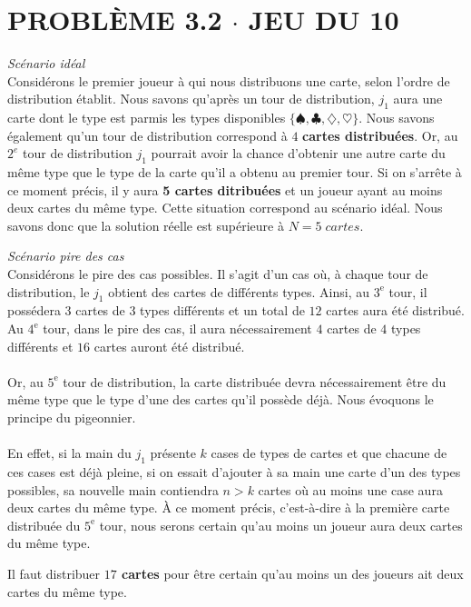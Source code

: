 \documentclass[8pt]{report}
\begin{document}
        \section*{\textnormal{PROBLÈME 3.2 \;\;\;\; $\cdot$ \;\;\;\; JEU DU 10 }} 
        \noindent \textcolor{myb}{\textit{Scénario idéal}}\\ 
        \indent Considérons le premier joueur à qui nous distribuons une carte, selon l'ordre de distribution établit. Nous 
        savons qu'après un tour de distribution, $j_1$ aura une carte dont le type est parmis les types disponibles 
        $\{\spadesuit, \clubsuit, \diamondsuit, \heartsuit\}$. Nous savons également qu'un tour de distribution 
        correspond à $4$ \textbf{cartes distribuées}. Or, au $2^e$ tour de distribution $j_1$ pourrait avoir la chance 
        d'obtenir une autre carte du même type que le type de la carte qu'il a obtenu au premier tour. Si on s'arrête à 
        ce moment précis, il y aura \textbf{5 cartes ditribuées} et un joueur ayant au moins deux cartes du même type. 
        Cette situation correspond au scénario idéal. Nous savons donc que la solution réelle est supérieure à $N = 5 \; cartes$.

        \vspace{1em}
        \noindent\textcolor{myb}{\textit{Scénario pire des cas}}\\ 
        \indent Considérons le pire des cas possibles. Il s'agit d'un cas où, à chaque tour de distribution, 
        le $j_1$ obtient des cartes 
        de différents types. Ainsi, au $3^\text{e}$ tour, il possédera $3$ cartes de $3$ types différents et un total de $12$ 
        cartes aura été distribué. Au $4^\text{e}$ tour, dans le pire des cas, il aura nécessairement $4$ cartes de $4$ types 
        différents et $16$ cartes auront été distribué. \\\\ 
        \indent Or, au $5^\text{e}$ tour de distribution, la carte distribuée devra nécessairement être du même type que le type 
        d'une des cartes qu'il possède déjà. Nous évoquons le principe du pigeonnier. \\\\
        \indent En effet, si la main du $j_1$ 
        présente $k$ cases de types de cartes et que chacune de ces cases est déjà pleine, si on essait d'ajouter à sa 
        main une carte d'un des types possibles, sa nouvelle main contiendra $n > k$ cartes où au moins une case aura 
        deux cartes du même type. À ce moment précis, c'est-à-dire à la première carte distribuée du $5^{\text{e}}$ 
        tour, nous serons certain qu'au moins un joueur aura deux cartes du même type.
        \begin{Reponse}{}{}
            Il faut distribuer \textbf{$17$ cartes} pour être certain qu'au moins un des joueurs ait deux cartes du même type. 
        \end{Reponse}
\end{document}
